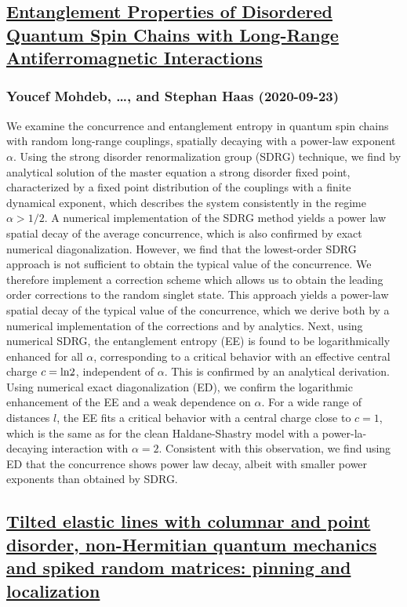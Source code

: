 \subsection*{\href{http://arxiv.org/abs/2009.11286v1}{Entanglement Properties of Disordered Quantum Spin Chains with  Long-Range Antiferromagnetic Interactions}}
\subsubsection*{Youcef Mohdeb, \dots, and Stephan Haas (2020-09-23)}
We examine the concurrence and entanglement entropy in quantum spin chains
with random long-range couplings, spatially decaying with a power-law exponent
$\alpha$. Using the strong disorder renormalization group (SDRG) technique, we
find by analytical solution of the master equation a strong disorder fixed
point, characterized by a fixed point distribution of the couplings with a
finite dynamical exponent, which describes the system consistently in the
regime $\alpha > 1/2$. A numerical implementation of the SDRG method yields a
power law spatial decay of the average concurrence, which is also confirmed by
exact numerical diagonalization. However, we find that the lowest-order SDRG
approach is not sufficient to obtain the typical value of the concurrence. We
therefore implement a correction scheme which allows us to obtain the leading
order corrections to the random singlet state. This approach yields a power-law
spatial decay of the typical value of the concurrence, which we derive both by
a numerical implementation of the corrections and by analytics. Next, using
numerical SDRG, the entanglement entropy (EE) is found to be logarithmically
enhanced for all $\alpha$, corresponding to a critical behavior with an
effective central charge $c = {\rm ln} 2$, independent of $\alpha$. This is
confirmed by an analytical derivation. Using numerical exact diagonalization
(ED), we confirm the logarithmic enhancement of the EE and a weak dependence on
$\alpha$. For a wide range of distances $l$, the EE fits a critical behavior
with a central charge close to $c=1$, which is the same as for the clean
Haldane-Shastry model with a power-la-decaying interaction with $\alpha =2$.
Consistent with this observation, we find using ED that the concurrence shows
power law decay, albeit with smaller power exponents than obtained by SDRG.

\subsection*{\href{http://arxiv.org/abs/2009.11284v1}{Tilted elastic lines with columnar and point disorder, non-Hermitian  quantum mechanics and spiked random matrices: pinning and localization}}

